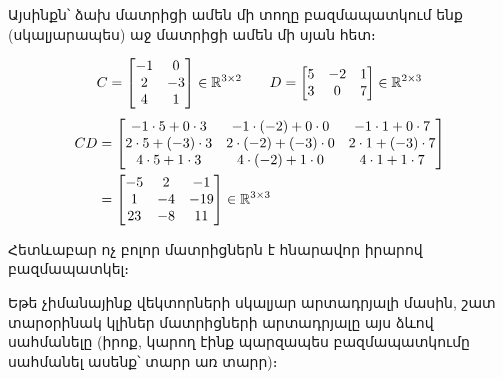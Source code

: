 Այսինքն՝ ձախ մատրիցի ամեն մի տողը բազմապատկում ենք (սկալյա\-րա\-պես) աջ մատրիցի ամեն մի սյան հետ։

\begin{example}
\[
  C = \begin{bmatrix}
    -1 & 0 \\
    2 & -3 \\
    4 & 1 \\
  \end{bmatrix}\in \mathbb{R}^{3 \times 2}
  \qquad
  D = \begin{bmatrix}
    5 & -2 & 1 \\
    3 & 0 & 7 \\
  \end{bmatrix}\in \mathbb{R}^{2 \times 3}
\]
\begin{align*}
  CD &= \begin{bmatrix}
    -1 \cdot 5 + 0 \cdot 3 & -1 \cdot (-2) + 0 \cdot 0 & -1 \cdot 1 + 0 \cdot 7 \\
    2 \cdot 5 + (-3) \cdot 3 & 2 \cdot (-2) + (-3) \cdot 0 & 2 \cdot 1 + (-3) \cdot 7 \\
    4 \cdot 5 + 1 \cdot 3 & 4 \cdot (-2) + 1 \cdot 0 & 4 \cdot 1 + 1 \cdot 7 \\
  \end{bmatrix}
 \\&= \begin{bmatrix}
    -5 & 2 & -1 \\
    1 & -4 & -19 \\
    23 & -8 & 11 \\
  \end{bmatrix}\in\mathbb{R}^{3 \times 3}
\end{align*}
\end{example}




Հետևաբար ոչ բոլոր մատրիցներն է հնարավոր իրարով բազմապատկել։


Եթե չիմանայինք վեկտորների սկալյար արտադրյալի մասին, շատ տարօրինակ կլիներ մատրիցների արտադրյալը այս ձևով սահմանելը (իրոք, կարող էինք պարզապես բազմապատկումը սահմանել ասենք՝ տարր առ տարր)։ 

